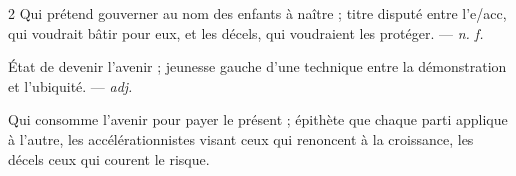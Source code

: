 \begin{multicols}{2}
 Qui prétend gouverner au nom des enfants à naître ; titre disputé entre l'e/acc, qui voudrait bâtir pour eux, et les décels, qui voudraient les protéger. —  \textit{n. f.}

 État de devenir l'avenir ; jeunesse gauche d'une technique entre la démonstration et l'ubiquité.  —  \textit{adj.}

  Qui consomme l'avenir pour payer le présent ; épithète que chaque parti applique à l'autre, les accélérationnistes visant ceux qui renoncent à la croissance, les décels ceux qui courent le risque.

\end{multicols}

